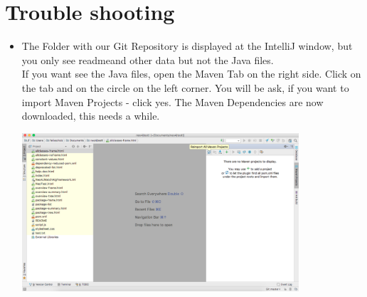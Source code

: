 \section{Trouble shooting} \label{sec:trouble}

\begin{itemize}
	\item 
		The Folder with our \glqq Git Repository\grqq{} is displayed at the \glqq IntelliJ\grqq{} window, but you only see \glqq readme\grqq{}and other data but not the Java files. \\
		If you want see the Java files, open the Maven Tab on the right side. Click on the tab and on the circle on the left corner. You will be ask, if you want to \glqq import Maven Projects\grqq{} - click \glqq yes\grqq{}. The \glqq Maven Dependencies\grqq{} are now downloaded, this needs a while.
		\begin{center}
			\includegraphics[width=10.3cm]{common/MavenImport.png}\setlength{\unitlength}{1mm}
		\end{center}
\end{itemize}
